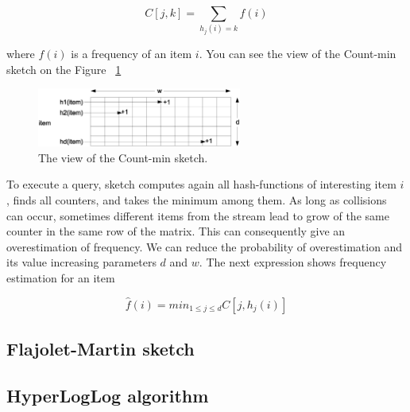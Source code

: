 $$
C[j, k] = \sum_{h_j(i)=k}f(i)
$$

where $f(i)$ is a frequency of an item $i$.
You can see the view of the Count-min sketch on the Figure ~\ref{fig:count_min_sketch}

\begin{figure}[H]
  \centering
  \includegraphics [width=0.6\textwidth]{images/CountMinSketch}
  \caption{The view of the Count-min sketch.}
  \label{fig:count_min_sketch}
\end{figure}

To execute a query, sketch computes again all hash-functions of interesting item $i$, finds all counters, and takes the minimum among them.
As long as collisions can occur, sometimes different items from the stream lead to grow of the same counter in the same row of the matrix.
This can consequently give an overestimation of frequency.
We can reduce the probability of overestimation and its value increasing parameters $d$ and $w$.
The next expression shows frequency estimation for an item

$$
\hat{f}(i) = min_{1 \leq j \leq d}C[j,h_j(i)]
$$

\subsection{Flajolet-Martin sketch}



\subsection{HyperLogLog algorithm}